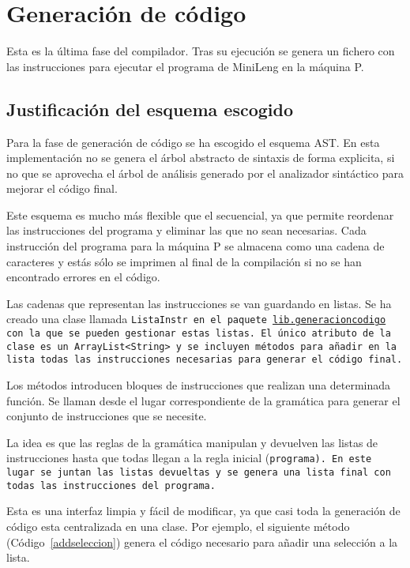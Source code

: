 \section{Generación de código}
Esta es la última fase del compilador. Tras su ejecución se genera un fichero con las instrucciones para ejecutar el programa de MiniLeng en la máquina P.

\subsection{Justificación del esquema escogido}\label{eleccion}
Para la fase de generación de código se ha escogido el esquema AST. En esta implementación no se genera el árbol abstracto de sintaxis de forma explicita, si no que se aprovecha el árbol de análisis generado por el analizador sintáctico para mejorar el código final.

Este esquema es mucho más flexible que el secuencial, ya que permite reordenar las instrucciones del programa y eliminar las que no sean necesarias. Cada instrucción del programa para la máquina P se almacena como una cadena de caracteres y estás sólo se imprimen al final de la compilación si no se han encontrado errores en el código.

Las cadenas que representan las instrucciones se van guardando en listas. Se ha creado una clase llamada \tt{ListaInstr} en el paquete \url{lib.generacioncodigo} con la que se pueden gestionar estas listas. El único atributo de la clase es un \tt{ArrayList<String>} y se incluyen métodos para añadir en la lista todas las instrucciones necesarias para generar el código final.

Los métodos introducen bloques de instrucciones que realizan una determinada función. Se llaman desde el lugar correspondiente de la gramática para generar el conjunto de instrucciones que se necesite.

La idea es que las reglas de la gramática manipulan y devuelven las listas de instrucciones hasta que todas llegan a la regla inicial (\tt{programa}). En este lugar se juntan las listas devueltas y se genera una lista final con todas las instrucciones del programa.

Esta es una interfaz limpia y fácil de modificar, ya que casi toda la generación de código esta centralizada en una clase. Por ejemplo, el siguiente método (Código~\ref{addseleccion}) genera el código necesario para añadir una selección a la lista.

